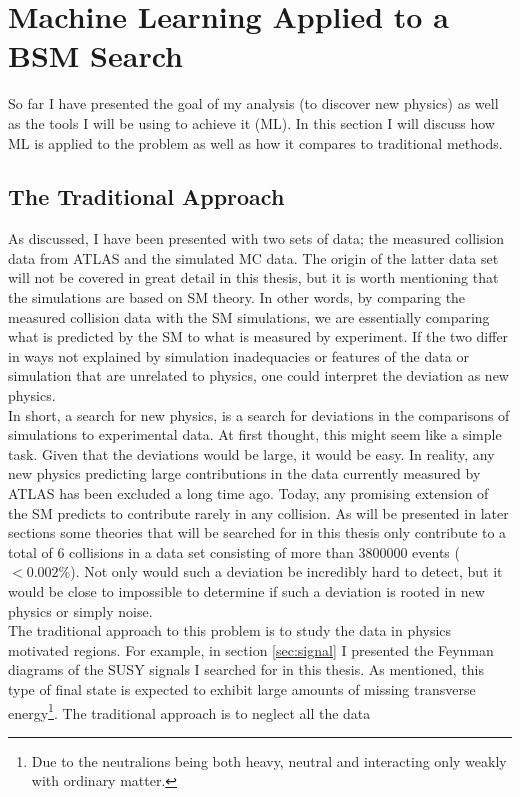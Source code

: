 \section{Machine Learning Applied to a BSM Search}\label{sec:MLHEP}
So far I have presented the goal of my analysis (to discover new physics)
as well as the tools I will be using to achieve it (\ac{ML}). In this section
I will discuss how \ac{ML} is applied to the problem as well as how it compares
to traditional methods.
\subsection{The Traditional Approach}
As discussed, I have been presented with two sets of data; the measured collision 
data from \ac{ATLAS} and the simulated \ac{MC} data. The origin of the latter data set 
will not be covered in great detail in this thesis, but it is worth mentioning that 
the simulations are based on \ac{SM} theory. In other words, by comparing the measured collision 
data with the \ac{SM} simulations, we are essentially comparing what is predicted by the \ac{SM} 
to what is measured by experiment. If the two differ in ways not explained by simulation inadequacies 
or features of the data or simulation that are unrelated to physics, one could interpret the deviation 
as new physics.
\\
In short, a search for new physics, is a search for deviations in the comparisons of simulations 
to experimental data. At first thought, this might seem like a simple task. Given that the deviations 
would be large, it would be easy. In reality, any new physics predicting large contributions 
in the data currently measured by \ac{ATLAS} has been excluded a long time ago. Today, any
promising extension of the \ac{SM} predicts to contribute rarely in any collision. As will 
be presented in later sections some theories that will be searched for in this thesis only 
contribute to a total of 6 collisions in a data set consisting of more than $3800000$ events 
($<0.002\%$). Not only would such a deviation be incredibly hard to detect, but it would 
be close to impossible to determine if such a deviation is rooted in new physics or simply 
noise. 
\\
The traditional approach to this problem is to study the data in physics motivated regions. 
For example, in section \ref{sec:signal} I presented the Feynman diagrams of the \ac{SUSY} signals I 
searched for in this thesis. As mentioned, this type of final state is expected to exhibit 
large amounts of missing transverse energy\footnote{Due to the neutralions being both heavy, neutral 
and interacting only weakly with ordinary matter.}. The traditional approach is to neglect all the data 
